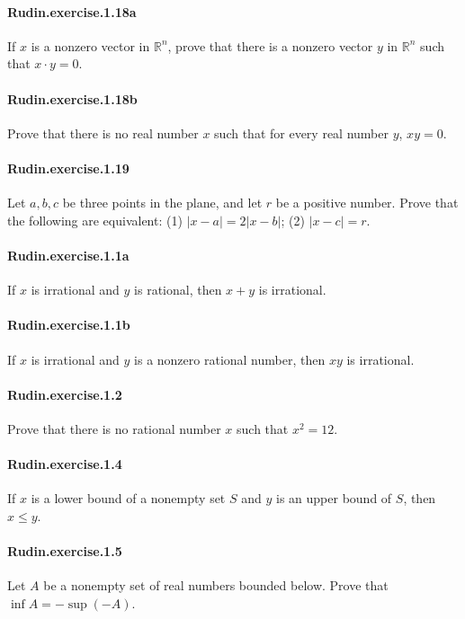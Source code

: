 \documentclass{article}
\begin{document}
\paragraph{Rudin.exercise.1.18a} If $x$ is a nonzero vector in $\mathbb{R}^n$, prove that there is a nonzero vector $y$ in $\mathbb{R}^n$ such that $x\cdot y = 0$.

\paragraph{Rudin.exercise.1.18b} Prove that there is no real number $x$ such that for every real number $y$, $xy=0$.

\paragraph{Rudin.exercise.1.19} Let $a, b, c$ be three points in the plane, and let $r$ be a positive number. Prove that the following are equivalent: (1) $|x-a|=2|x-b|$; (2) $|x-c|=r$.

\paragraph{Rudin.exercise.1.1a} If $x$ is irrational and $y$ is rational, then $x+y$ is irrational.

\paragraph{Rudin.exercise.1.1b} If $x$ is irrational and $y$ is a nonzero rational number, then $xy$ is irrational.

\paragraph{Rudin.exercise.1.2} Prove that there is no rational number $x$ such that $x^2=12$.

\paragraph{Rudin.exercise.1.4} If $x$ is a lower bound of a nonempty set $S$ and $y$ is an upper bound of $S$, then $x\leq y$.

\paragraph{Rudin.exercise.1.5} Let $A$ be a nonempty set of real numbers bounded below. Prove that $\inf A = -\sup(-A)$.
\end{document}
